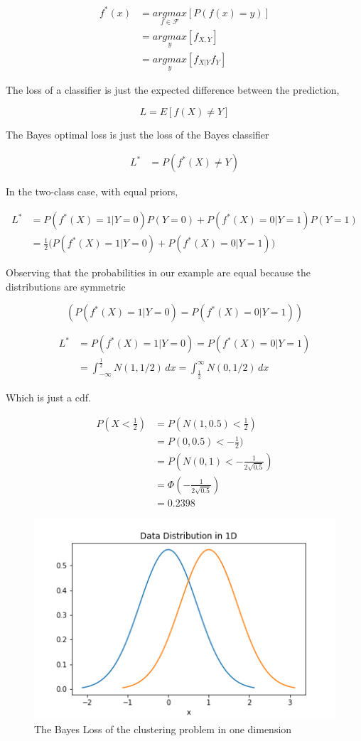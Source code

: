 \documentclass{article}
\begin{document}
\begin{align*}
    f^*(x) &= \underset{f \in \mathcal{F}}{argmax} [P(f(x)=y)]\\
    &= \underset{y}{argmax} [f_{X,Y}]\\
    &= \underset{y}{argmax} [f_{X|Y}f_Y]
\end{align*}

The loss of a classifier is just the expected difference between the prediction,

$$L = E[f(X) \neq Y]$$

The Bayes optimal loss is just the loss of the Bayes classifier

\begin{align*}
    L^* &= P(f^*(X) \neq Y)
\end{align*}

In the two-class case, with equal priors,

\begin{align*}
    L^* &= P(f^*(X)=1|Y=0)P(Y=0) + P(f^*(X)=0|Y=1)P(Y=1)\\
    &= \frac{1}{2}\Big(P(f^*(X)=1|Y=0)+P(f^*(X)=0|Y=1)\Big)
\end{align*}

Observing that the probabilities in our example are equal because the distributions are symmetric

$$(P(f^*(X)=1|Y=0) = P(f^*(X)=0|Y=1))$$

\begin{align*}
    L^* &= P(f^*(X)=1|Y=0) = P(f^*(X)=0|Y=1)\\
    &= \int_{-\infty}^{\frac{1}{2}} N(1,1/2)\,dx = \int_{\frac{1}{2}}^\infty N(0,1/2)\,dx
\end{align*}

Which is just a cdf.

\begin{align*}
    P(X < \frac{1}{2}) &= P(N(1,0.5) < \frac{1}{2})\\
    &= P(0, 0.5) < -\frac{1}{2})\\
    &= P(N(0,1) < -\frac{1}{2\sqrt{0.5}})\\
    &= \Phi(-\frac{1}{2\sqrt{0.5}})\\
    &= 0.2398
\end{align*}

\begin{figure}[!ht]
  \centering
  \includegraphics[scale=0.5]{bayes.png}
  \caption{The Bayes Loss of the clustering problem in one dimension}
\end{figure}
\end{document}
